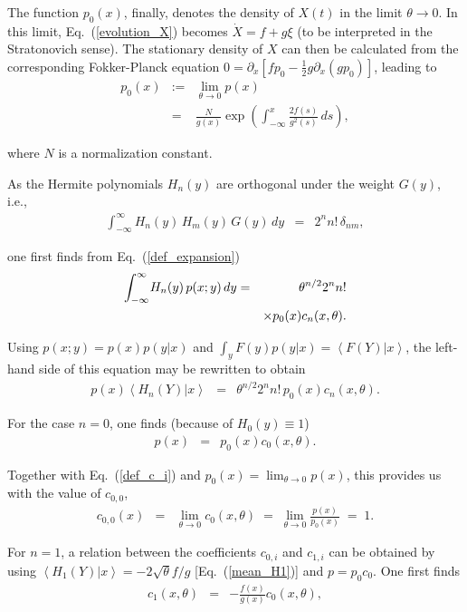 \documentclass[aps,twocolumn,superscriptaddress,showpacs,showkeys]{revtex4}
\newcommand{\p}{\partial}
\begin{document}
{\noindent The function $p_0(x)$, finally, denotes the density of $X(t)$ in the limit $\theta\to 0$. In this limit,
Eq.~(\ref{evolution_X}) becomes $\dot X=f+g\xi$ (to be interpreted in the Stratonovich sense). The stationary density
of $X$ can then be calculated from the corresponding Fokker-Planck equation
$0=\p_x[fp_0-\frac{1}{2}g\p_x(gp_0)]$, leading to
%
\begin{eqnarray}\label{def_p0}
p_0(x) &:=& \lim_{\theta\to 0} p(x)\nonumber\\
&=& \frac{N}{g(x)}\exp\left(\int_{-\infty\!}^x \frac{2f(s)}{g^2(s)}\,ds \right),
\end{eqnarray}

\noindent where $N$ is a normalization constant.

As the Hermite polynomials $H_n(y)$ are orthogonal under the weight $G(y)$, i.e.,
%
\begin{eqnarray}
\int_{-\infty\!}^\infty H_n(y)\,H_m(y)\,G(y)\,dy &=& 2^n n!\, \delta_{nm},
\end{eqnarray}

\noindent one first finds from Eq.~(\ref{def_expansion})
%
\begin{eqnarray}
\int_{-\infty\!}^\infty H_n(y)\,p(x;y)\,dy &=& \theta^{n/2}2^n n! \cr&&\times p_0(x) c_n(x,\theta) .
\end{eqnarray}

\noindent Using $p(x;y)=p(x)p(y|x)$ and $\int_yF(y)p(y|x)=\left<F(Y)|x\right>$, the left-hand side of this equation may
be rewritten to obtain
%
\begin{eqnarray}
p(x)\left<H_n(Y)|x\right> &=& \theta^{n/2}2^n n!\,p_0(x) c_n(x,\theta) .
\end{eqnarray}

\noindent For the case $n=0$, one finds (because of $H_0(y)\equiv 1$)
%
\begin{eqnarray}
p(x) &=& p_0(x)c_0(x,\theta).
\end{eqnarray}

\noindent Together with Eq.~(\ref{def_c_i})
and $p_0(x)=\lim_{\theta\to 0}p(x)$, this provides us with the value of $c_{0,0}$,
%
\begin{eqnarray}
c_{0,0}(x) &=& \lim_{\theta\to 0} c_0(x,\theta) \;=\; \lim_{\theta\to 0}\frac{p(x)}{p_0(x)} \;=\; 1.
\end{eqnarray}

\noindent For $n=1$, a relation between the coefficients $c_{0,i}$ and $c_{1,i}$ can be obtained by using
$\left<H_1(Y)|x\right>=-2\sqrt{\theta}f/g$ [Eq.~(\ref{mean_H1})] and $p=p_0c_0$. One first finds
%
\begin{eqnarray}\label{relation_c1_c0}
c_1(x,\theta) &=& -\frac{f(x)}{g(x)}c_0(x,\theta),
\end{eqnarray}

}
\end{document}
